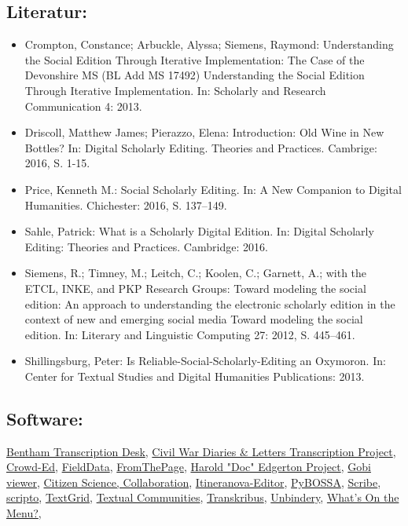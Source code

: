 \documentclass{article}
\begin{document}
        \subsection*{Literatur:}\begin{itemize}\item Crompton, Constance; Arbuckle, Alyssa; Siemens, Raymond: Understanding the Social Edition Through Iterative Implementation: The Case of the Devonshire MS (BL Add MS 17492) Understanding the Social Edition Through Iterative Implementation. In: Scholarly and Research Communication 4: 2013.\item Driscoll, Matthew James; Pierazzo, Elena: Introduction: Old Wine in New Bottles? In: Digital Scholarly Editing. Theories and Practices. Cambrige: 2016, S. 1-15.\item Price, Kenneth M.: Social Scholarly Editing. In: A New Companion to Digital Humanities. Chichester: 2016, S. 137–149.\item Sahle, Patrick: What is a Scholarly Digital Edition. In: Digital Scholarly Editing: Theories and Practices. Cambridge: 2016.\item Siemens, R.; Timney, M.; Leitch, C.; Koolen, C.; Garnett, A.; with the ETCL, INKE, and PKP Research Groups: Toward modeling the social edition: An approach to understanding the electronic scholarly edition in the context of new and emerging social media Toward modeling the social edition. In: Literary and Linguistic Computing 27: 2012, S. 445–461.\item Shillingsburg, Peter: Is Reliable-Social-Scholarly-Editing an Oxymoron. In: Center for Textual Studies and Digital Humanities Publications: 2013.\end{itemize}\subsection*{Software:}\href{http://transcribe-bentham.ucl.ac.uk/td/Transcribe_Bentham}{Bentham Transcription Desk}, \href{https://diyhistory.lib.uiowa.edu}{Civil War Diaries & Letters Transcription Project}, \href{https://github.com/gsbodine/crowd-ed}{Crowd-Ed}, \href{http://www.ala.org.au/get-involved/citizen-science/fielddata-software/}{FieldData}, \href{https://fromthepage.com/}{FromThePage}, \href{http://edgerton-digital-collections.org/notebooks}{Harold "Doc" Edgerton Project}, \href{http://www.digiverso.com/de/products/viewer}{Gobi viewer}, \href{https://islandora.ca/}{Citizen Science, Collaboration}, \href{http://www.mom-wiki.uni-koeln.de/}{Itineranova-Editor}, \href{http://pybossa.com/}{PyBOSSA}, \href{http://github.com/zooniverse/Scribe}{Scribe}, \href{http://scripto.org/}{scripto}, \href{https://textgrid.de/}{TextGrid}, \href{https://textualcommunities.org/app/}{Textual Communities}, \href{https://transkribus.eu/Transkribus/}{Transkribus}, \href{http://bencrowder.net/coding/unbindery/}{Unbindery}, \href{http://menus.nypl.org/}{What's On the Menu?}, 
\end{document}
